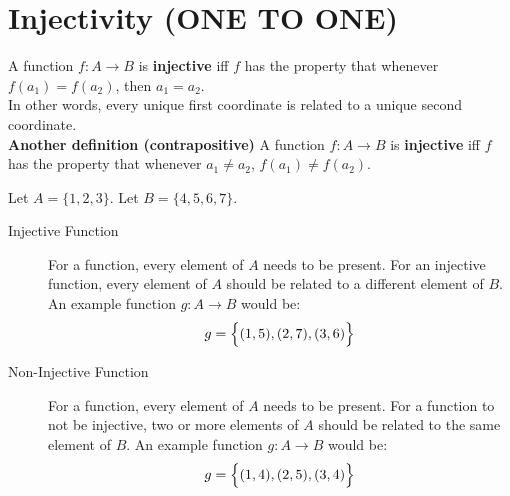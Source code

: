 \documentclass[../notes.tex]{subfiles}
\begin{document}
		\section[Injectivity]{Injectivity (ONE TO ONE)}
			A function $f: A \rightarrow B$ is \textbf{injective} iff $f$ has the property that whenever $f(a_{1}) = f(a_{2})$, then $a_{1} = a_{2}$.\\
			In other words, every unique first coordinate is related to a unique second coordinate.\\
			\textbf{Another definition (contrapositive)} A function $f: A \rightarrow B$ is \textbf{injective} iff $f$ has the property that whenever $a_{1} \neq a_{2}$, $f(a_{1}) \neq f(a_{2})$.
			\begin{examplebox}
				Let $A = \{1, 2, 3\}$. Let $B = \{4, 5, 6, 7\}$.
				\begin{description}
					\item[Injective Function] For a function, every element of $A$ needs to be present. For an injective function, every element of $A$ should be related to a different element of $B$. An example function $g: A \rightarrow B$ would be:
						\begin{align*}
							g = \Bigl\{(1, 5), (2, 7), (3, 6)\Bigr\}
						\end{align*}
					\item[Non-Injective Function] For a function, every element of $A$ needs to be present. For a function to not be injective, two or more elements of $A$ should be related to the same element of $B$. An example function $g: A \rightarrow B$ would be:
						\begin{align*}
							g = \Bigl\{(1, 4), (2, 5), (3, 4)\Bigr\}
						\end{align*}
				\end{description}
			\end{examplebox}
\end{document}
